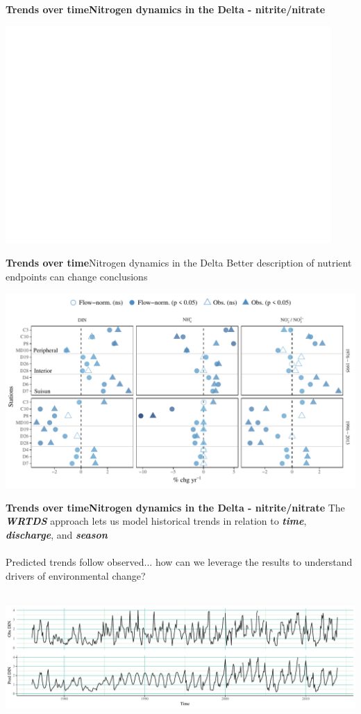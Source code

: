 \documentclass[serif]{beamer}\usepackage[]{graphicx}\usepackage[]{color}
\newcommand{\emtxt}[1]{\textbf{\textit{#1}}}
\begin{document}
\begin{frame}{\textbf{Trends over time}}{\textbf{Nitrogen dynamics in the Delta - nitrite/nitrate}} 
\centerline{\includegraphics[width = 0.93\textwidth, page = 2]{fig/trndsperno23.pdf}}
\end{frame}

\begin{frame}{\textbf{Trends over time}}{Nitrogen dynamics in the Delta}
Better description of nutrient endpoints can change conclusions
\centerline{\includegraphics[width = \textwidth]{fig/trndcomp1.pdf}}
\end{frame}



\begin{frame}{\textbf{Trends over time}}{\textbf{Nitrogen dynamics in the Delta - nitrite/nitrate}} 
The \emtxt{WRTDS} approach lets us model historical trends in relation to \emtxt{time}, \emtxt{discharge}, and \emtxt{season}\\~\\
Predicted trends follow observed... how can we leverage the results to understand drivers of environmental change? \\~\\
\centerline{\includegraphics[width = \textwidth]{fig/ts_ex2.pdf}}
\end{frame}
\end{document}
